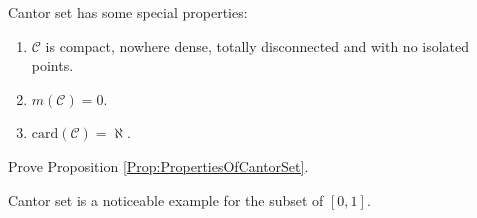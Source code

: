 \begin{prop}
    \label{Prop:PropertiesOfCantorSet}
    Cantor set has some special properties:
    \begin{enumerate}
        \item $\mathcal{C}$ is compact, nowhere dense, 
        totally disconnected and with no isolated points.
        \item $m(\mathcal{C})=0$.
        \item $\text{card}(\mathcal{C})=\aleph$.
    \end{enumerate}
\end{prop}
\begin{exc}
    Prove Proposition \ref{Prop:PropertiesOfCantorSet}.
\end{exc}
\begin{rem}
    Cantor set is a noticeable example 
    for the subset of $[0,1]$.
\end{rem}